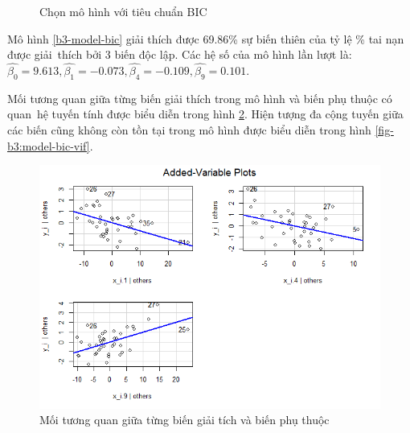 \begin{figure}[H]
	\centering
	\hfill
	\caption{Chọn mô hình với tiêu chuẩn BIC}
	\label{fig-b3:model-bic}
\end{figure}

Mô hình \ref{b3-model-bic} giải thích được 69.86\% sự biến thiên của tỷ lệ \% tai nạn được giải~thích bởi 3 biến độc lập. Các hệ số của mô hình lần lượt là: $\hat{\beta_0}=9.613, \hat{\beta_1}=-0.073, \hat{\beta_4}=-0.109, \hat{\beta_9}=0.101$.

Mối tương quan giữa từng biến giải thích trong mô hình và biến phụ thuộc có quan~hệ tuyến tính được biểu diễn trong hình \ref{fig-b3:model-bic-vars}. Hiện tượng đa cộng tuyến giữa các biến cũng không còn tồn tại trong mô hình được biểu diễn trong hình \ref{fig-b3:model-bic-vif}.
\begin{figure}[H]
	\centering
	\includegraphics[width=0.65\linewidth]{images/B3/model-bic-vars}
	\caption{Mối tương quan giữa từng biến giải tích và biến phụ thuộc}
	\label{fig-b3:model-bic-vars}
\end{figure}

